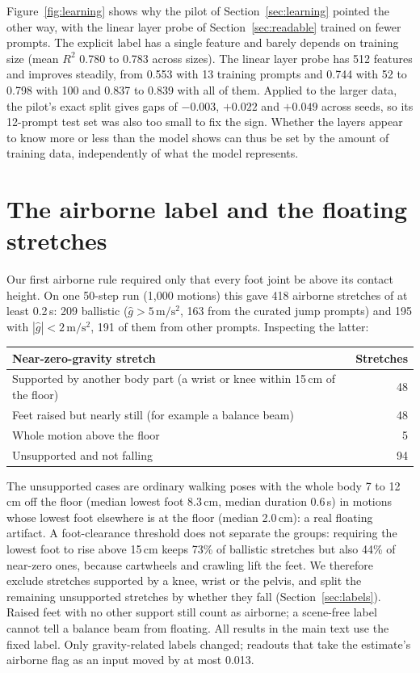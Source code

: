 Figure~\ref{fig:learning} shows why the pilot of Section~\ref{sec:learning} pointed the other way, with the linear layer probe of Section~\ref{sec:readable} trained on fewer prompts. The explicit label has a single feature and barely depends on training size (mean $R^2$ 0.780 to 0.783 across sizes). The linear layer probe has 512 features and improves steadily, from 0.553 with 13 training prompts and 0.744 with 52 to 0.798 with 100 and 0.837 to 0.839 with all of them. Applied to the larger data, the pilot's exact split gives gaps of $-0.003$, $+0.022$ and $+0.049$ across seeds, so its 12-prompt test set was also too small to fix the sign. Whether the layers appear to know more or less than the model shows can thus be set by the amount of training data, independently of what the model represents.

\section{The airborne label and the floating stretches}
\label{app:labelfix}

Our first airborne rule required only that every foot joint be above its contact height. On one 50-step run (1,000 motions) this gave 418 airborne stretches of at least 0.2\,s: 209 ballistic ($\hat g > 5\,\mathrm{m/s^2}$, 163 from the curated jump prompts) and 195 with $|\hat g| < 2\,\mathrm{m/s^2}$, 191 of them from other prompts. Inspecting the latter:

\begin{center}
\begin{tabular}{lr}
\toprule
Near-zero-gravity stretch & Stretches \\
\midrule
Supported by another body part (a wrist or knee within 15\,cm of the floor) & 48 \\
Feet raised but nearly still (for example a balance beam) & 48 \\
Whole motion above the floor & 5 \\
Unsupported and not falling & 94 \\
\bottomrule
\end{tabular}
\end{center}

The unsupported cases are ordinary walking poses with the whole body 7 to 12\,cm off the floor (median lowest foot 8.3\,cm, median duration 0.6\,s) in motions whose lowest foot elsewhere is at the floor (median 2.0\,cm): a real floating artifact. A foot-clearance threshold does not separate the groups: requiring the lowest foot to rise above 15\,cm keeps 73\% of ballistic stretches but also 44\% of near-zero ones, because cartwheels and crawling lift the feet. We therefore exclude stretches supported by a knee, wrist or the pelvis, and split the remaining unsupported stretches by whether they fall (Section~\ref{sec:labels}). Raised feet with no other support still count as airborne; a scene-free label cannot tell a balance beam from floating. All results in the main text use the fixed label. Only gravity-related labels changed; readouts that take the estimate's airborne flag as an input moved by at most 0.013.


